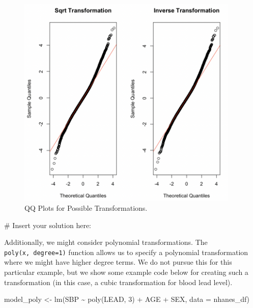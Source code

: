 \documentclass[
  letterpaper,
]{krantz}
\makeatletter
\newenvironment{Shaded}{\begin{snugshade}}{\end{snugshade}}
\newcommand{\AttributeTok}[1]{\textcolor[rgb]{0.40,0.45,0.13}{#1}}
\newcommand{\CommentTok}[1]{\textcolor[rgb]{0.37,0.37,0.37}{#1}}
\newcommand{\DecValTok}[1]{\textcolor[rgb]{0.68,0.00,0.00}{#1}}
\newcommand{\FunctionTok}[1]{\textcolor[rgb]{0.28,0.35,0.67}{#1}}
\newcommand{\NormalTok}[1]{\textcolor[rgb]{0.00,0.23,0.31}{#1}}
\newcommand{\OtherTok}[1]{\textcolor[rgb]{0.00,0.23,0.31}{#1}}
\newcommand{\SpecialCharTok}[1]{\textcolor[rgb]{0.37,0.37,0.37}{#1}}
\newenvironment{kframe}{%
\medskip{}
\setlength{\fboxsep}{.8em}
 \def\at@end@of@kframe{}%
 \ifinner\ifhmode%
  \def\at@end@of@kframe{\end{minipage}}%
  \begin{minipage}{\columnwidth}%
 \fi\fi%
 \def\FrameCommand##1{\hskip\@totalleftmargin \hskip-\fboxsep
 \colorbox{shadecolor}{##1}\hskip-\fboxsep
     \hskip-\linewidth \hskip-\@totalleftmargin \hskip\columnwidth}%
 \MakeFramed {\advance\hsize-\width
   \@totalleftmargin\z@ \linewidth\hsize
   \@setminipage}}%
 {\par\unskip\endMakeFramed%
 \at@end@of@kframe}
\renewenvironment{Shaded}{\begin{kframe}}{\end{kframe}}
\makeatother
\begin{document}
\begin{figure}

{\centering \includegraphics[width=4.16667in,height=\textheight]{book/images/10-practicequestion3answer.png}

}

\caption{\label{fig-pq2}QQ Plots for Possible Transformations.}

\end{figure}

\begin{Shaded}
\begin{Highlighting}[]
\CommentTok{\# Insert your solution here:}
\end{Highlighting}
\end{Shaded}

Additionally, we might consider polynomial transformations. The
\texttt{poly(x,\ degree=1)} function allows us to specify a polynomial
transformation where we might have higher degree terms. We do not pursue
this for this particular example, but we show some example code below
for creating such a transformation (in this case, a cubic transformation
for blood lead level).

\begin{Shaded}
\begin{Highlighting}[]
\NormalTok{model\_poly }\OtherTok{\textless{}{-}} \FunctionTok{lm}\NormalTok{(SBP }\SpecialCharTok{\textasciitilde{}} \FunctionTok{poly}\NormalTok{(LEAD, }\DecValTok{3}\NormalTok{) }\SpecialCharTok{+}\NormalTok{ AGE }\SpecialCharTok{+}\NormalTok{ SEX, }\AttributeTok{data =}\NormalTok{ nhanes\_df)}
\end{Highlighting}
\end{Shaded}
\end{document}
